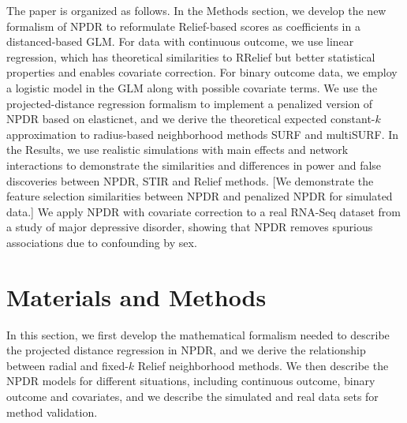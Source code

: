 \documentclass[10pt]{article}
\begin{document}

The paper is organized as follows.
In the Methods section, we develop the new formalism of NPDR to reformulate Relief-based scores as coefficients in a distanced-based GLM.
For data with continuous outcome, we use linear regression, which has theoretical similarities to RRelief but better statistical properties and enables covariate correction.
For binary outcome data, we employ a logistic model in the GLM along with possible covariate terms.
We use the projected-distance regression formalism to implement a penalized version of NPDR based on elasticnet, and we derive the theoretical expected constant-$k$ approximation to radius-based neighborhood methods SURF and multiSURF. 
In the Results, we use realistic simulations with main effects and network interactions to demonstrate the similarities and differences in power and false discoveries between NPDR, STIR and Relief methods.
[We demonstrate the feature selection similarities between NPDR and penalized NPDR for simulated data.]
We apply NPDR with covariate correction to a real RNA-Seq dataset from a study of major depressive disorder, showing that NPDR removes spurious associations due to confounding by sex.




\section{Materials and Methods}
In this section, we first develop the mathematical formalism needed to describe the projected distance regression in NPDR, and we derive the relationship between radial and fixed-$k$ Relief neighborhood methods. We then describe the NPDR models for different situations, including continuous outcome, binary outcome and covariates, and we describe the simulated and real data sets for method validation. 

\def\ri{R_i}
\def\rj{R_j}
\def\kmi{k_{M_i}}
\def\khi{k_{H_i}}
\def\hji{H_{j_i}}
\def\ma{\overline{M}_a}
\def\ha{\overline{H}_a}
\def\mnu{M_\nu}
\def\hnu{H_\nu}
\def\myd{\text{diff}}
\def\ka{\bar{k}_\alpha}
\end{document}
